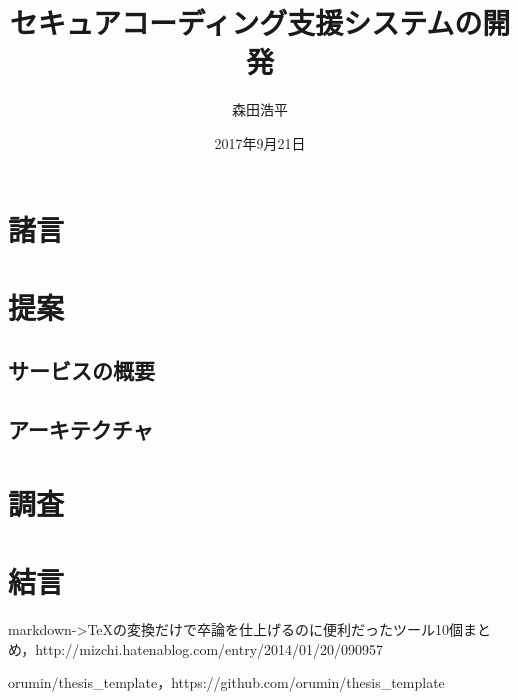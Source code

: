 \documentclass[shinchoku]{hitsotsuron} %
\title{セキュアコーディング支援システムの開発}
\author{森田浩平}
\date{2017年9月21日}
\begin{document}

\twocolumn[%
\maketitle
]

\section{諸言}



\section{提案}



\subsection{サービスの概要}


\subsection{アーキテクチャ}


\section{調査}


\section{結言}


\begin{thebibliography}{1}

markdown->TeXの変換だけで卒論を仕上げるのに便利だったツール10個まとめ，http://mizchi.hatenablog.com/entry/2014/01/20/090957

orumin/thesis\_template，https://github.com/orumin/thesis\_template

\end{thebibliography}
\end{document}
